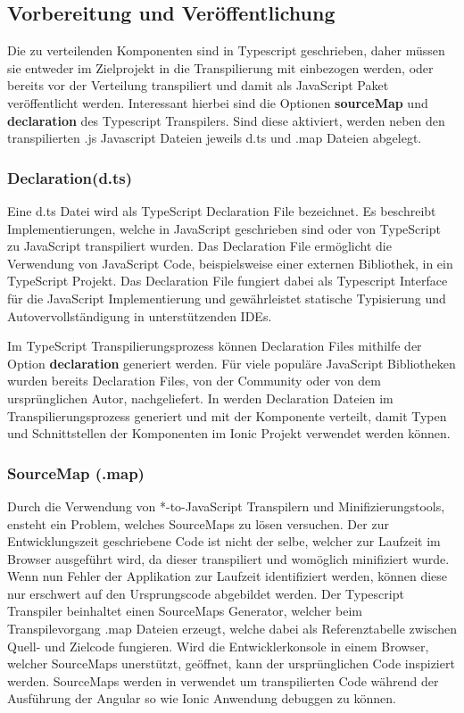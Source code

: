 \subsection{Vorbereitung und Veröffentlichung}

Die zu verteilenden Komponenten sind in Typescript geschrieben,
daher müssen sie entweder im Zielprojekt in die Transpilierung mit einbezogen werden,
oder bereits vor der Verteilung transpiliert und damit als JavaScript Paket veröffentlicht werden.
Interessant hierbei sind die Optionen \textbf{sourceMap} und \textbf{declaration} des Typescript Transpilers.
Sind diese aktiviert, werden neben den transpilierten .js Javascript Dateien jeweils d.ts und .map Dateien abgelegt.

\subsubsection{Declaration(d.ts)}

Eine d.ts Datei wird als TypeScript Declaration File bezeichnet.
Es beschreibt Implementierungen, welche in JavaScript geschrieben sind oder von TypeScript zu JavaScript transpiliert wurden.
Das Declaration File ermöglicht die Verwendung von JavaScript Code, beispielsweise einer externen Bibliothek,
in ein TypeScript Projekt. Das Declaration File fungiert dabei als Typescript Interface
für die JavaScript Implementierung und gewährleistet statische Typisierung
und Autovervollständigung in unterstützenden IDEs.

Im TypeScript Transpilierungsprozess können Declaration Files mithilfe der Option \textbf{declaration} generiert werden.
Für viele populäre JavaScript Bibliotheken wurden bereits Declaration Files, von der Community oder von dem ursprünglichen Autor, nachgeliefert.
In \projectname{} werden Declaration Dateien im Transpilierungsprozess generiert und mit der Komponente verteilt,
damit Typen und Schnittstellen der Komponenten im Ionic Projekt verwendet werden können.
\cite[471]{EssentialTS}

\subsubsection{SourceMap (.map)}
Durch die Verwendung von *-to-JavaScript Transpilern und Minifizierungstools, ensteht ein Problem, welches SourceMaps zu lösen versuchen.
Der zur Entwicklungszeit geschriebene Code ist nicht der selbe, welcher zur Laufzeit im Browser ausgeführt wird, da dieser transpiliert und womöglich minifiziert wurde.
Wenn nun Fehler der Applikation zur Laufzeit identifiziert werden, können diese nur erschwert auf den Ursprungscode abgebildet werden.
Der Typescript Transpiler beinhaltet einen SourceMaps Generator, welcher beim Transpilevorgang .map Dateien erzeugt,
welche dabei als Referenztabelle zwischen Quell- und Zielcode fungieren.
Wird die Entwicklerkonsole in einem Browser, welcher SourceMaps unerstützt, geöffnet, kann der ursprünglichen Code inspiziert werden.
SourceMaps werden in \projectname{} verwendet um transpilierten Code während der Ausführung der Angular so wie Ionic Anwendung debuggen zu können.
\cite{Using97:online}




